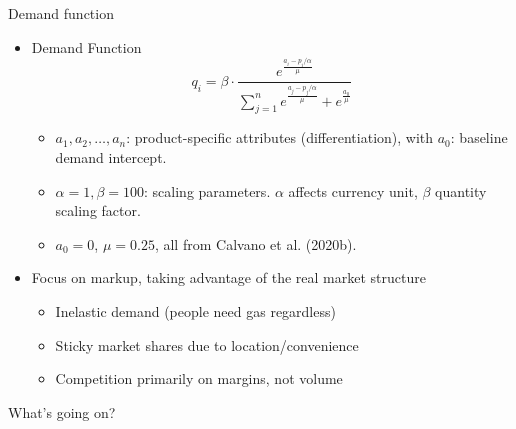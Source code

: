 \documentclass[10pt, aspectratio=169]{beamer}
\begin{document}
\begin{frame}[fragile]{Demand function}
\begin{itemize}
    \item \textcite{calvano_artificial_2020} Demand Function
    $$
q_i = \beta \cdot \frac{e^{\frac{a_i - p_i/\alpha}{\mu}}}{\sum_{j=1}^{n} e^{\frac{a_j - p_j/\alpha}{\mu}} + e^{\frac{a_0}{\mu}}}
$$
\begin{itemize}
    \item $a_1, a_2, \ldots, a_n$: product-specific attributes (differentiation), with $a_0$: baseline demand intercept.
    \item $\alpha=1, \beta=100$: scaling parameters. $\alpha$ affects currency unit, $\beta$ quantity scaling factor.
    \item $a_0 = 0$, $\mu = 0.25$, all from Calvano et al. (2020b).
\end{itemize}
    \item Focus on markup, taking advantage of the real market structure
    \begin{itemize}
        \item Inelastic demand (people need gas regardless)
        \item Sticky market shares due to location/convenience
        \item Competition primarily on margins, not volume
    \end{itemize}
\end{itemize}
  
\end{frame}



\begin{frame}{What's going on?}
\end{frame}



%  
%  

\end{document}
